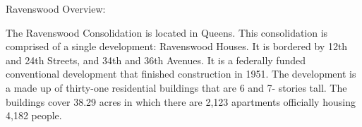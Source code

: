 Ravenswood Overview:       

     

The Ravenswood Consolidation is located in Queens. This consolidation is comprised of a single development: Ravenswood Houses. It is bordered by 12th and 24th Streets, and 34th and 36th Avenues. It is a federally funded conventional development that finished construction in 1951. The development is a made up of thirty-one residential buildings that are 6 and 7- stories tall. The buildings cover 38.29 acres in which there are 2,123 apartments officially housing 4,182 people.   

 